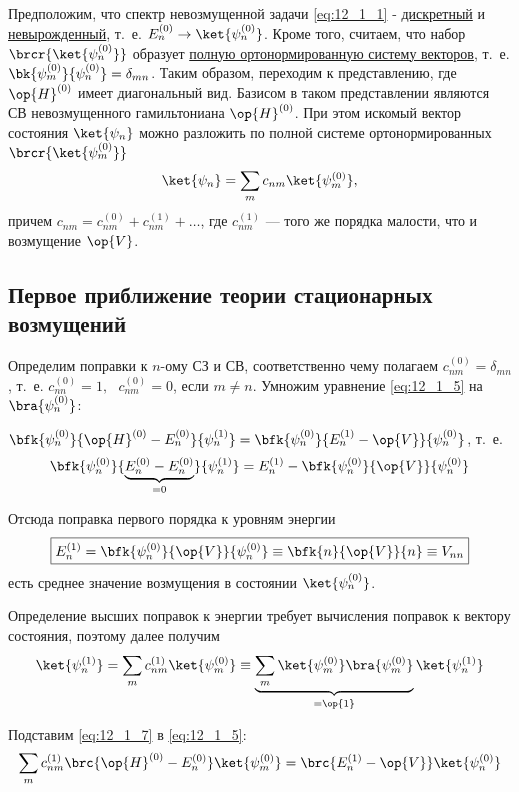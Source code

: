 Предположим, что спектр невозмущенной задачи \eqref{eq:12_1_1} - \underline{дискретный} и \underline{невырожденный}, т.~е. $E_n^{(0)} \to \ket{\psi_n^{(0)}}$. Кроме того, считаем, что набор $\brcr{\ket{\psi_n^{(0)}}}$ образует \underline{полную ортонормированную систему векторов}, т.~е. $\bk{\psi_m^{(0)}}{\psi_n^{(0)}} = \delta_{mn}$. Таким образом, переходим к представлению, где $\op{H}^{(0)}$ имеет диагональный вид. Базисом в таком представлении являются СВ невозмущенного гамильтониана $\op{H}^{(0)}$. При этом искомый вектор состояния $\ket{\psi_n}$ можно разложить по полной системе ортонормированных $\brcr{\ket{\psi_m^{(0)}}}$
$$
\ket{\psi_n}= \sum_m c_{nm} \ket{\psi_m^{(0)}}, 
$$
причем $c_{nm} = c_{nm}^{(0)} + c_{nm}^{(1)} + \dots$, где $c_{nm}^{(1)}$ --- того же порядка малости, что и возмущение $\op{V}$.

\subsection{Первое приближение теории стационарных возмущений}

Определим поправки к $n$-ому СЗ и СВ, соответственно чему полагаем $\boxed{c_{nm}^{(0)} =\delta_{mn}}$, т.~е. $c_{nn}^{(0)} = 1,~~~c_{nm}^{(0)} = 0$, если $m \neq n$. Умножим уравнение \eqref{eq:12_1_5} на $\bra{\psi_n^{(0)}}$:

$\bfk{\psi_n^{(0)}}{\op{H}^{(0)} - E_n^{(0)}}{\psi_n^{(1)}} = \bfk{\psi_n^{(0)}}{E_n^{(1)} - \op{V}}{\psi_n^{(0)}}$, т.~е.
$$
\bfk{\psi_n^{(0)}}{ \underbrace{E_n^{(0)} -  E_n^{(0)}}_{=0}}{\psi_n^{(1)}} = E_n^{(1)} - \bfk{\psi_n^{(0)}}{\op{V}}{\psi_n^{(0)}}
$$

Отсюда поправка первого порядка к уровням энергии
$$
\boxed{E_n^{(1)} = \bfk{\psi_n^{(0)}}{\op{V}}{\psi_n^{(0)}} \equiv \bfk{n}{\op{V}}{n} \equiv V_{nn}}
$$
есть среднее значение возмущения в состоянии $\ket{\psi_n^{(0)}}$.

Определение высших поправок к энергии требует вычисления поправок к вектору состояния, поэтому далее получим
\begin{equation}
\label{eq:12_1_7}
\ket{\psi_n^{(1)}} = \sum_m c_{nm}^{(1)} \ket{\psi_m^{(0)}} \equiv \underbrace{\sum_m \ket{\psi_m^{(0)}} \bra{\psi_m^{(0)}}}_{=\op{1}} \ket{\psi_n^{(1)}}
\end{equation}

Подставим \eqref{eq:12_1_7} в \eqref{eq:12_1_5}:
$$
\sum_m c_{nm}^{(1)} \brc{\op{H}^{(0)} - E_n^{(0)}}\ket{\psi_m^{(0)}} = \brc{E_n^{(1)} - \op{V}}\ket{\psi_n^{(0)}}
$$

